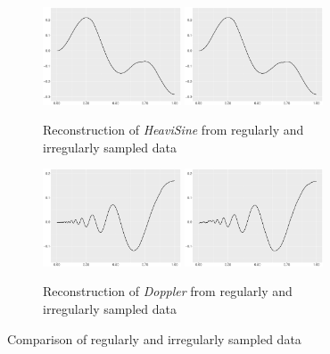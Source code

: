 \begin{figure}[h!]
\begin{subfigure}{\textwidth}
    \end{subfigure}
    \begin{subfigure}{\textwidth}
    \centering
    \includegraphics[width=0.45\textwidth]{Chapters/02TractorSplineTheory/plot/ggplot/ggheavisinreg.pdf}
    \includegraphics[width=0.45\textwidth]{Chapters/02TractorSplineTheory/plot/ggplot/ggheavisinire.pdf}
    \caption{Reconstruction of \textit{HeaviSine} from regularly and irregularly sampled data}
    \end{subfigure}
    \begin{subfigure}{\textwidth}
    \centering
    \includegraphics[width=0.45\textwidth]{Chapters/02TractorSplineTheory/plot/ggplot/ggdopplerreg.pdf}
    \includegraphics[width=0.45\textwidth]{Chapters/02TractorSplineTheory/plot/ggplot/ggdopplerire.pdf}
    \caption{Reconstruction of \textit{Doppler} from regularly and irregularly sampled data}
    \end{subfigure}
 \caption{Comparison of regularly and irregularly sampled data}\label{irregularFigure}
 \end{figure}




